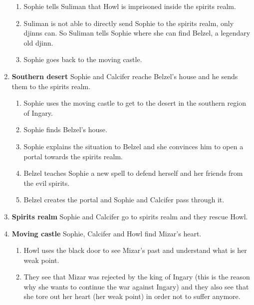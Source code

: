 \begin{enumerate}
\begin{enumerate}
    \item Sophie tells Suliman that Howl is imprisoned inside the spirits realm.
    
    \item Suliman is not able to directly send Sophie to the spirits realm, only djinns can. So Suliman tells Sophie where she can find Belzel, a legendary old djinn.
    
    \item Sophie goes back to the moving castle.
  \end{enumerate}

\item \textbf{Southern desert} Sophie and Calcifer reache Belzel’s house and he sends them to the spirits realm.

  \begin{enumerate}
  \item Sophie uses the moving castle to get to the desert in the southern region of Ingary.
    
  \item Sophie finds Belzel’s house.
    
  \item Sophie explains the situation to Belzel and she convinces him to open a portal towards the spirits realm.
    
  \item Belzel teaches Sophie a new spell to defend herself and her friends from the evil spirits.
    
  \item Belzel creates the portal and Sophie and Calcifer pass through it.
  \end{enumerate}

\item \textbf{Spirits realm} Sophie and Calcifer go to spirits realm and they rescue Howl.

\item \textbf{Moving castle}  Sophie, Calcifer and Howl find Mizar’s heart.

  \begin{enumerate}
  \item Howl uses the black door to see Mizar’s past and understand what is her weak point.
    
  \item They see that Mizar was rejected by the king of Ingary (this is the reason why she wants to continue the war against Ingary) and they also see that she tore out her heart (her weak point) in order not to suffer anymore.
    

\end{enumerate}
\end{enumerate}
